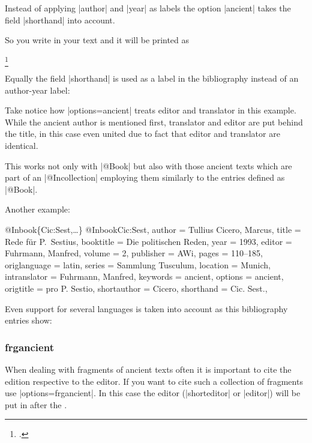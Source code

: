 \documentclass[a4paper,
10pt,
greek,
french,
spanish,
italian,
ngerman,
english,
]{ltxdoc}
\begin{document}
Instead of applying |author| and |year| as labels the option |ancient| takes the field |shorthand| into account.

So you write in your text and it will be printed as

\begin{example}
\footnote{\cite[1, 3,3]{Cic:Att}.}
\end{example} 

Equally the field |shorthand| is used as a label in the bibliography instead of an author-year label:

Take notice how |options={ancient}| treats editor and translator in this example. 
While the ancient author is mentioned first, translator and editor are put behind the title, 
in this case even united due to fact that editor and translator are identical.

This works not only with |@Book| but also with those ancient texts which are part of an |@Incollection| employing them similarly to the entries defined as |@Book|.

Another example:
\begin{bibexample}[label=Cic:Sest]{{@}Inbook\{Cic:Sest,…\}}
@Inbook{Cic:Sest,
  author       = {Tullius Cicero, Marcus},
  title        = {Rede für P.\ Sestius},
  booktitle    = {Die politischen Reden},
  year         = {1993},
  editor       = {Fuhrmann, Manfred},
  volume       = {2},
  publisher    = AWi,    %
  pages        = {110--185},
  origlanguage = {latin},
  series       = {Sammlung Tusculum},
  location     = Munich,      %
  intranslator = {Fuhrmann, Manfred},
  keywords     = {ancient},
  options      = {ancient},
  origtitle    = {pro P. Sestio},
  shortauthor  = {Cicero},
  shorthand    = {Cic. Sest.},
}
\end{bibexample}

Even support for several languages is taken into account as this bibliography entries show: 

\subsubsection{frgancient}\label{frgancient}
When dealing with fragments of ancient texts often it is important to cite the edition respective to the editor.
If you want to cite such a collection of fragments use |options={frgancient}|.
In this case the editor (|shorteditor| or |editor|) will be put in after the . 
\end{document}
